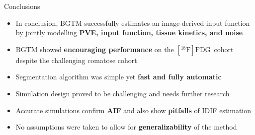 \documentclass[aspectratio=169]{beamer}
\newcommand{\fdg}{$[^{18}\mathrm{F}]\text{FDG}$}
\begin{document}
\begin{frame}{Conclusions}
	\begin{itemize}
		\setlength\itemsep{1.7em}
		\item In conclusion, BGTM successfully estimates an image-derived input function by jointly modelling \textbf{PVE, input function, tissue kinetics, and noise}
		\item BGTM showed \textbf{encouraging performance} on the \fdg\ cohort despite the challenging comatose cohort
		\item Segmentation algorithm was simple yet \textbf{fast and fully automatic}
		\item Simulation design proved to be challenging and needs further research
		\item Accurate simulations confirm \textbf{AIF} and also show \textbf{pitfalls} of IDIF estimation
		\item No assumptions were taken to allow for \textbf{generalizability} of the method
	\end{itemize}
\end{frame}
\end{document}
